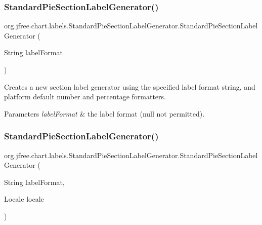 \subsubsection{\texorpdfstring{Standard\+Pie\+Section\+Label\+Generator()}{StandardPieSectionLabelGenerator()}\hspace{0.1cm}{\footnotesize\ttfamily [3/5]}}
{\footnotesize\ttfamily org.\+jfree.\+chart.\+labels.\+Standard\+Pie\+Section\+Label\+Generator.\+Standard\+Pie\+Section\+Label\+Generator (\begin{DoxyParamCaption}\item[{String}]{label\+Format }\end{DoxyParamCaption})}

Creates a new section label generator using the specified label format string, and platform default number and percentage formatters.


\begin{DoxyParams}{Parameters}
{\em label\+Format} & the label format ({\ttfamily null} not permitted). \\
\hline
\end{DoxyParams}
\mbox{\label{classorg_1_1jfree_1_1chart_1_1labels_1_1_standard_pie_section_label_generator_a423b600ec04b0c45da8f39b4f3b854fd}} 
\subsubsection{\texorpdfstring{Standard\+Pie\+Section\+Label\+Generator()}{StandardPieSectionLabelGenerator()}\hspace{0.1cm}{\footnotesize\ttfamily [4/5]}}
{\footnotesize\ttfamily org.\+jfree.\+chart.\+labels.\+Standard\+Pie\+Section\+Label\+Generator.\+Standard\+Pie\+Section\+Label\+Generator (\begin{DoxyParamCaption}\item[{String}]{label\+Format,  }\item[{Locale}]{locale }\end{DoxyParamCaption})}

